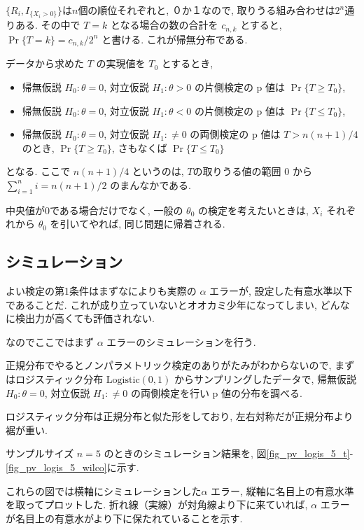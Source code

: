 \documentclass[12pt]{jsarticle}
\begin{document}
$\{R_i, I_{\{X_i>0\}}\}$は$n$個の順位それぞれと, ０か１なので, 取りうる組み合わせは$2^n$通りある. 
その中で $T=k$ となる場合の数の合計を $c_{n,k}$ とすると, $\Pr\{T=k\} = c_{n,k}/2^n$ と書ける. これが帰無分布である.

データから求めた $T$ の実現値を $T_0$ とするとき, 
\begin{itemize}
\item 帰無仮説 $H_0: \theta = 0$, 対立仮説 $H_1: \theta > 0$ の片側検定の p 値は $\Pr\{T \ge T_0\}$, 
\item 帰無仮説 $H_0: \theta = 0$, 対立仮説 $H_1: \theta < 0$ の片側検定の p 値は $\Pr\{T \le T_0\}$,
\item 帰無仮説 $H_0: \theta = 0$, 対立仮説 $H_1: \neq  0$ の両側検定の p 値は
$T > n(n+1)/4$ のとき, $\Pr\{T \ge T_0\}$, さもなくば $\Pr\{T \le T_0\}$
\end{itemize}
となる.
ここで $n(n+1)/4$ というのは, $T$の取りうる値の範囲 0 から $\sum_{i=1}^{n} i= n(n+1)/2$ のまんなかである.

中央値が0である場合だけでなく, 一般の $\theta_0$ の検定を考えたいときは, $X_i$ それぞれから $\theta_0$ を引いてやれば, 同じ問題に帰着される.

\subsection{シミュレーション}
\label{simu1sample}

よい検定の第1条件はまずなによりも実際の $\alpha$ エラーが, 設定した有意水準以下であることだ. 
これが成り立っていないとオオカミ少年になってしまい, どんなに検出力が高くても評価されない. 

なのでここではまず $\alpha$ エラーのシミュレーションを行う.

正規分布でやるとノンパラメトリック検定のありがたみがわからないので, まずはロジスティック分布 $\mathrm{Logistic}(0,1)$ からサンプリングしたデータで, 帰無仮説 $H_0: \theta = 0$, 対立仮説 $H_1: \neq  0$ の両側検定を行い p 値の分布を調べる. 

ロジスティック分布は正規分布と似た形をしており, 左右対称だが正規分布より裾が重い.

サンプルサイズ $n=5$ のときのシミュレーション結果を, 図\ref{fig_pv_logis_5_t}-\ref{fig_pv_logis_5_wilco}に示す.

これらの図では横軸にシミュレーションした$\alpha$ エラー, 縦軸に名目上の有意水準を取ってプロットした. 
折れ線（実線）が対角線より下に来ていれば, $\alpha$ エラーが名目上の有意水がより下に保たれていることを示す.
\end{document}
